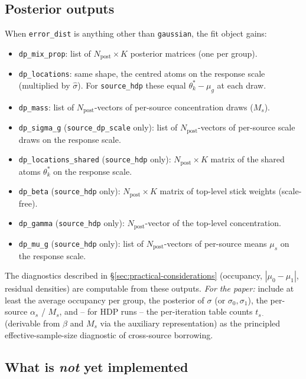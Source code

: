 \documentclass[11pt]{article}
\theoremstyle{plain}
\theoremstyle{definition}
\theoremstyle{remark}
\newcommand{\1}{\mathds{1}}
\begin{document}
\subsection{Posterior outputs}

When \texttt{error\_dist} is anything other than \texttt{gaussian}, the fit object gains:
\begin{itemize}[noitemsep]
  \item \texttt{dp\_mix\_prop}: list of $N_\mathrm{post} \times K$ posterior matrices (one per group).
  \item \texttt{dp\_locations}: same shape, the centred atoms on the response scale (multiplied by $\hat\sigma$). For \texttt{source\_hdp} these equal $\theta^*_k - \mu_g$ at each draw.
  \item \texttt{dp\_mass}: list of $N_\mathrm{post}$-vectors of per-source concentration draws ($M_s$).
  \item \texttt{dp\_sigma\_g} (\texttt{source\_dp\_scale} only): list of $N_\mathrm{post}$-vectors of per-source scale draws on the response scale.
  \item \texttt{dp\_locations\_shared} (\texttt{source\_hdp} only): $N_\mathrm{post} \times K$ matrix of the shared atoms $\theta^*_k$ on the response scale.
  \item \texttt{dp\_beta} (\texttt{source\_hdp} only): $N_\mathrm{post} \times K$ matrix of top-level stick weights (scale-free).
  \item \texttt{dp\_gamma} (\texttt{source\_hdp} only): $N_\mathrm{post}$-vector of the top-level concentration.
  \item \texttt{dp\_mu\_g} (\texttt{source\_hdp} only): list of $N_\mathrm{post}$-vectors of per-source means $\mu_s$ on the response scale.
\end{itemize}
The diagnostics described in \S\ref{sec:practical-considerations} (occupancy, $|\mu_0 - \mu_1|$, residual densities) are computable from these outputs. \emph{For the paper:} include at least the average occupancy per group, the posterior of $\sigma$ (or $\sigma_0, \sigma_1$), the per-source $\alpha_s$ / $M_s$, and -- for HDP runs -- the per-iteration table counts $t_{s\cdot}$ (derivable from $\beta$ and $M_s$ via the auxiliary representation) as the principled effective-sample-size diagnostic of cross-source borrowing.

\subsection{What is \emph{not} yet implemented}\label{sec:impl-todo}
\end{document}
